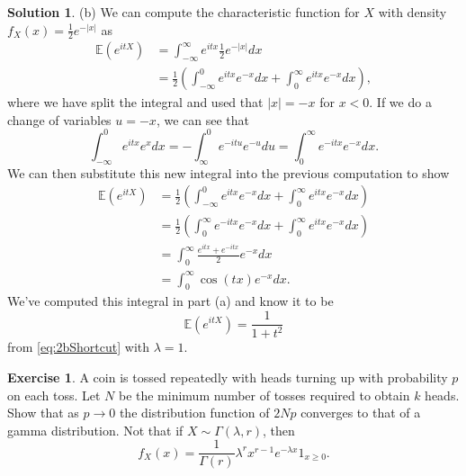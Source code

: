 \documentclass[12pt]{article}
\newcommand{\abs}[1]{ \left| #1 \right| }
\newcommand{\Expect}{\mathbb{E}}
\theoremstyle{definition}
\newtheorem{exer}{Exercise}
\newtheorem{sol}{Solution}
\theoremstyle{remark}
\begin{document}
\begin{sol}
  \newpage

  (b) We can compute the characteristic function for $X$ with density $f_{X}(x) = \frac{1}{2} e^{- \abs{x}}$ as
  \begin{align*}
      \Expect(e^{itX}) &= \int_{-\infty}^{\infty} e^{itx}   \frac{1}{2} e^{- \abs{x}}dx\\
                       &= \frac{1}{2} \left(\int_{-\infty}^{0} e^{itx} e^{-x}dx  + \int_{0}^{\infty} e^{itx} e^{-x}dx  \right),
  \end{align*}
  where we have split the integral and used that $\abs{x} = -x$ for $x<0$. If we do a change of variables $u = -x$, we can see that
  \begin{equation*}
      \int_{-\infty}^{0} e^{itx} e^{x}dx = -\int_{\infty}^{0} e^{-itu} e^{-u}du = \int_{0}^{\infty} e^{-itx} e^{-x}dx.
  \end{equation*}
We can then substitute this new integral into the previous computation to show
\begin{align*}
\Expect(e^{itX})  &= \frac{1}{2} \left(\int_{-\infty}^{0} e^{itx} e^{-x}dx  + \int_{0}^{\infty} e^{itx} e^{-x}dx  \right) \\
                  &= \frac{1}{2} \left(\int_{0}^{\infty} e^{-itx} e^{-x}dx + \int_{0}^{\infty} e^{itx} e^{-x}dx  \right) \\
                  &= \int_{0}^{\infty} \frac{e^{itx} + e^{-itx}}{2} e^{-x}dx\\
                  &= \int_{0}^{\infty} \cos(tx) e^{-x}dx.
\end{align*}
We've computed this integral in part (a) and know it to be 
\begin{equation*}
\Expect(e^{itX}) = \frac{1}{1+t^{2}}
\end{equation*}
from \eqref{eq:2bShortcut} with $\lambda = 1$.
  \end{sol}

\newpage

\begin{exer}
    A coin is tossed repeatedly with heads turning up with probability $p$ on each toss. Let $N$ be the minimum number of tosses required to obtain  $k$ heads. Show that as  $p\to 0$ the distribution function of  $2Np$ converges to that of a gamma distribution. Not that if  $X \sim \Gamma(\lambda, r)$, then 
    \begin{equation*}
        f_X(x) = \frac{1}{\Gamma(r)} \lambda^{r} x^{r-1} e^{-\lambda x} 1_{x\geq 0}.
    \end{equation*}
\end{exer}
\end{document}
